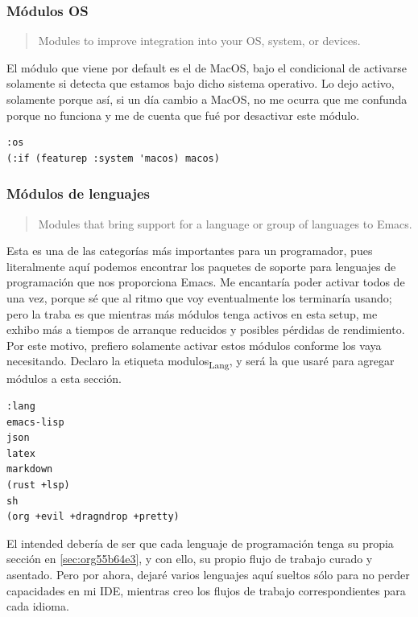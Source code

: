 \documentclass[11pt]{article}
\begin{document}
\subsubsection{Módulos OS}
\label{sec:org571eff4}

\begin{quote}
Modules to improve integration into your OS, system, or devices.
\end{quote}

El módulo que viene por default es el de MacOS, bajo el condicional de activarse solamente si detecta que estamos bajo dicho sistema operativo. Lo dejo activo, solamente porque así, si un día cambio a MacOS, no me ocurra que me confunda porque no funciona y me de cuenta que fué por desactivar este módulo.

\begin{verbatim}
:os
(:if (featurep :system 'macos) macos)

\end{verbatim}
\subsubsection{Módulos de lenguajes}
\label{sec:org01a61a8}

\begin{quote}
Modules that bring support for a language or group of languages to Emacs.
\end{quote}

Esta es una de las categorías más importantes para un programador, pues literalmente aquí podemos encontrar los paquetes de soporte para lenguajes de programación que nos proporciona Emacs. Me encantaría poder activar todos de una vez, porque sé que al ritmo que voy eventualmente los terminaría usando; pero la traba es que mientras más módulos tenga activos en esta setup, me exhibo más a tiempos de arranque reducidos y posibles pérdidas de rendimiento. Por este motivo, prefiero solamente activar estos módulos conforme los vaya necesitando. Declaro la etiqueta modulos\textsubscript{Lang}, y será la que usaré para agregar módulos a esta sección.

\begin{verbatim}
:lang
emacs-lisp
json
latex
markdown
(rust +lsp)
sh
(org +evil +dragndrop +pretty)
\end{verbatim}

El intended debería de ser que cada lenguaje de programación tenga su propia sección en \ref{sec:org55b64e3}, y con ello, su propio flujo de trabajo curado y asentado. Pero por ahora, dejaré varios lenguajes aquí sueltos sólo para no perder capacidades en mi IDE, mientras creo los flujos de trabajo correspondientes para cada idioma.
\end{document}
